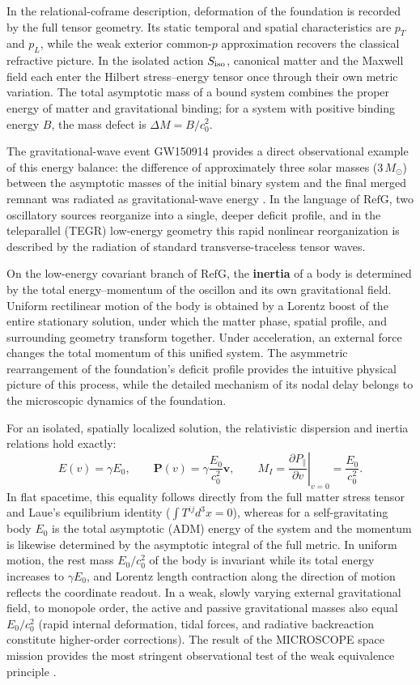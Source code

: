 \documentclass[11pt,a4paper]{article}
\newcommand{\RefG}{\mathrm{RefG}}
\begin{document}
In the relational-coframe description, deformation of the foundation is recorded by the full tensor geometry. Its static temporal and spatial characteristics are $p_T$ and $p_L$, while the weak exterior common-$p$ approximation recovers the classical refractive picture. In the isolated action $S_{\rm iso}$, canonical matter and the Maxwell field each enter the Hilbert stress--energy tensor once through their own metric variation. The total asymptotic mass of a bound system combines the proper energy of matter and gravitational binding; for a system with positive binding energy $B$, the mass defect is $\Delta M=B/c_0^2$.

The gravitational-wave event GW150914 provides a direct observational example of this energy balance: the difference of approximately three solar masses ($3\,M_\odot$) between the asymptotic masses of the initial binary system and the final merged remnant was radiated as gravitational-wave energy \citep{abbott2016}. In the language of $\RefG$, two oscillatory sources reorganize into a single, deeper deficit profile, and in the teleparallel (TEGR) low-energy geometry this rapid nonlinear reorganization is described by the radiation of standard transverse-traceless tensor waves.

On the low-energy covariant branch of $\RefG$, the \textbf{inertia} of a body is determined by the total energy--momentum of the oscillon and its own gravitational field. Uniform rectilinear motion of the body is obtained by a Lorentz boost of the entire stationary solution, under which the matter phase, spatial profile, and surrounding geometry transform together. Under acceleration, an external force changes the total momentum of this unified system. The asymmetric rearrangement of the foundation's deficit profile provides the intuitive physical picture of this process, while the detailed mechanism of its nodal delay belongs to the microscopic dynamics of the foundation.

For an isolated, spatially localized solution, the relativistic dispersion and inertia relations hold exactly:
\begin{equation}
E(v)=\gamma E_0,\qquad
\mathbf P(v)=\gamma\frac{E_0}{c_0^2}\mathbf v,\qquad
M_I=\left.\frac{\partial P_\parallel}{\partial v}\right|_{v=0}
=\frac{E_0}{c_0^2}.
\end{equation}
In flat spacetime, this equality follows directly from the full matter stress tensor and Laue's equilibrium identity ($\int T^{ij}d^3x=0$), whereas for a self-gravitating body $E_0$ is the total asymptotic (ADM) energy of the system and the momentum is likewise determined by the asymptotic integral of the full metric. In uniform motion, the rest mass $E_0/c_0^2$ of the body is invariant while its total energy increases to $\gamma E_0$, and Lorentz length contraction along the direction of motion reflects the coordinate readout. In a weak, slowly varying external gravitational field, to monopole order, the active and passive gravitational masses also equal $E_0/c_0^2$ (rapid internal deformation, tidal forces, and radiative backreaction constitute higher-order corrections). The result of the MICROSCOPE space mission provides the most stringent observational test of the weak equivalence principle \citep{touboul2022}.
\end{document}
